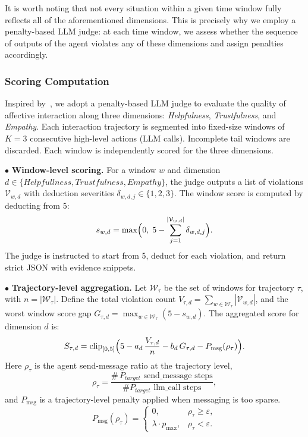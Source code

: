 \documentclass{article}
\theoremstyle{plain}
\theoremstyle{definition}
\theoremstyle{remark}
\begin{document}
It is worth noting that not every situation within a given time window fully reflects all of the aforementioned dimensions. This is precisely why we employ a penalty-based LLM judge: at each time window, we assess whether the sequence of outputs of the agent violates any of these dimensions and assign penalties accordingly.

\subsubsection{Scoring Computation}

Inspired by~\cite{0001WZY00YGC00X25}, we adopt a penalty-based LLM judge to evaluate the quality of affective interaction along three dimensions: \emph{Helpfulness}, \emph{Trustfulness}, and \emph{Empathy}. Each interaction trajectory is segmented into fixed-size windows of $K{=}3$ consecutive high-level actions (LLM calls). Incomplete tail windows are discarded. Each window is independently scored for the three dimensions.

$\bullet$ \textbf{Window-level scoring.}
For a window $w$ and dimension $d \in \{Helpfullness,Trustfulness,Empathy\}$, the judge outputs a list of violations $\mathcal{V}_{w,d}$ with deduction severities $\delta_{w,d,j} \in \{1,2,3\}$. The window score is computed by deducting from 5:
\begin{equation}
\label{eq:llmjudge_window}
s_{w,d} = \max\Bigl(0,\; 5 - \sum_{j=1}^{|\mathcal{V}_{w,d}|} \delta_{w,d,j}\Bigr).
\end{equation}
The judge is instructed to start from 5, deduct for each violation, and return strict JSON with evidence snippets.

$\bullet$ \textbf{Trajectory-level aggregation.}
Let $\mathcal{W}_{\tau}$ be the set of windows for trajectory $\tau$, with $n=|\mathcal{W}_{\tau}|$. Define the total violation count
$V_{\tau,d} = \sum_{w \in \mathcal{W}_{\tau}} |\mathcal{V}_{w,d}|$, and the worst window score gap
$G_{\tau,d} = \max_{w \in \mathcal{W}_{\tau}} (5 - s_{w,d})$.
The aggregated score for dimension $d$ is:
\begin{equation}
\label{eq:llmjudge_traj}
S_{\tau,d} = \mathrm{clip}_{[0,5]}\Bigl(5 - a_d\,\frac{V_{\tau,d}}{n} - b_d\,G_{\tau,d} - P_{\mathrm{msg}}(\rho_{\tau})\Bigr).
\end{equation}
Here $\rho_{\tau}$ is the agent send-message ratio at the trajectory level,\[
\rho_{\tau}
= \frac{\#\,P_{target}\,\,    
 \text{send\_message steps}}
       {\# P_{target}\text{ llm\_call steps}},
\]and $P_{\mathrm{msg}}$ is a trajectory-level penalty applied when messaging is too sparse.
\begin{equation}
\label{eq:llmjudge_msgpen}
P_{\mathrm{msg}}(\rho_{\tau}) =
\begin{cases}
0, & \rho_{\tau} \ge \varepsilon, \\
\lambda \cdot p_{\max}, & \rho_{\tau} < \varepsilon .
\end{cases}
\end{equation}
\end{document}
